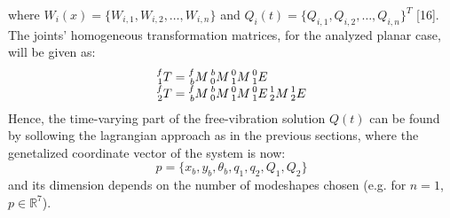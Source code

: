 \documentclass[a4paper,12pt,oneside]{report}
\begin{document}
where $W_i(x)=\{W_{i,1},W_{i,2},\dots,W_{i,n}\}$ and $Q_i(t)=\{Q_{i,1},Q_{i,2},\dots,Q_{i,n}\}^T$ [16].\\
The joints' homogeneous transformation matrices, for the analyzed planar case, will be given as:
\begin{equation}
  \begin{array}{l}
  \prescript{f}{1}{T}=\prescript{f}{b}{M}\prescript{b}{0}{M}\prescript{0}{1}{M}\prescript{0}{1}{E}\\
  \prescript{f}{2}{T}=\prescript{f}{b}{M}\prescript{b}{0}{M}\prescript{0}{1}{M}\prescript{0}{1}{E}\prescript{1}{2}{M}\prescript{1}{2}{E}\\
  \end{array}
  \label{new_kinematics}
\end{equation}
Hence, the time-varying part of the free-vibration solution $Q(t)$ can be found by sollowing the lagrangian approach as in the previous sections, where the genetalized coordinate vector of the system is now:
\begin{equation}
  p=\{x_b,y_b,\theta_b,q_1,q_2,Q_1,Q_2\}
  \label{new_coordinates}
\end{equation}
and its dimension depends on the number of modeshapes chosen (e.g. for $n=1$, $p\in\mathbb{R}^7$).\\
\end{document}
